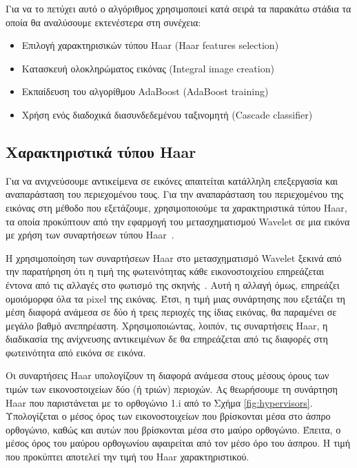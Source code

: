 Για να το πετύχει αυτό ο αλγόριθμος χρησιμοποιεί κατά σειρά τα παρακάτω στάδια
τα οποία θα αναλύσουμε εκτενέστερα στη συνέχεια:
\begin{itemize}
 \item Επιλογή χαρακτηρισικών τύπου Haar (Haar features selection)
 \item Κατασκευή ολοκληρώματος εικόνας (Integral image creation)
 \item Εκπαίδευση του αλγορίθμου AdaBoost (AdaBoost training)
 \item Χρήση ενός διαδοχικά διασυνδεδεμένου ταξινομητή (Cascade classifier)
\end{itemize}

\subsection{Χαρακτηριστικά τύπου Haar}

Για να ανιχνεύσουμε αντικείμενα σε εικόνες απαιτείται κατάλληλη επεξεργασία και
αναπαράσταση του περιεχομένου τους. Για την αναπαράσταση του περιεχομένου της εικόνας στη
μέθοδο που εξετάζουμε, χρησιμοποιούμε τα χαρακτηριστικά τύπου Haar, τα οποία προκύπτουν
από την εφαρμογή του μετασχηματισμού Wavelet σε μια εικόνα με χρήση των συναρτήσεων
τύπου Haar~\cite{Viola01rapidobject}.

Η χρησιμοποίηση των συναρτήσεων Haar στο μετασχηματισμό Wavelet ξεκινά από την
παρατήρηση ότι η τιμή της φωτεινότητας κάθε εικονοστοιχείου επηρεάζεται έντονα από τις
αλλαγές στο φωτισμό της σκηνής~\cite{OrePapSinOsu97}. Αυτή η αλλαγή όμως, επηρεάζει ομοιόμορφα
όλα τα pixel της εικόνας. Έτσι, η τιμή μιας συνάρτησης που εξετάζει τη μέση διαφορά
ανάμεσα σε δύο ή τρεις περιοχές της ίδιας εικόνας, θα παραμένει σε μεγάλο βαθμό ανεπηρέαστη.
Χρησιμοποιώντας, λοιπόν, τις συναρτήσεις Haar, η διαδικασία της ανίχνευσης αντικειμένων δε θα
επηρεάζεται από τις διαφορές στη φωτεινότητα από εικόνα σε εικόνα.

Οι συναρτήσεις Haar υπολογίζουν τη διαφορά ανάμεσα στους μέσους όρους των τιμών των
εικονοστοιχείων δύο (ή τριών) περιοχών. Ας θεωρήσουμε τη συνάρτηση Haar που παριστάνεται με
το ορθογώνιο 1.i από το Σχήμα \ref{fig:hypervisors}. Υπολογίζεται ο μέσος όρος των εικονοστοιχείων που
βρίσκονται μέσα στο άσπρο ορθογώνιο, καθώς και αυτών που βρίσκονται μέσα στο μαύρο
ορθογώνιο. Έπειτα, ο μέσος όρος του μαύρου ορθογωνίου αφαιρείται από τον μέσο όρο του
άσπρου. Η τιμή που προκύπτει αποτελεί την τιμή του Haar χαρακτηριστικού.


